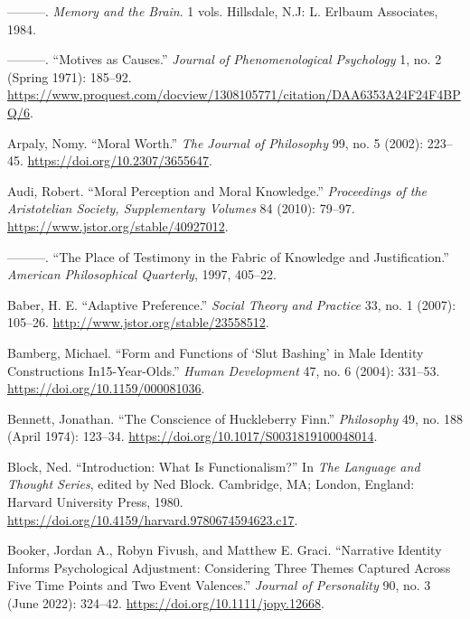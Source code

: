 \documentclass[phdthesis,12pt,final]{wuthesis}
\newlength{\cslhangindent}
\newenvironment{CSLReferences}[2] %
{\begin{list}{}{%
	\setlength{\itemindent}{0pt}
	\setlength{\leftmargin}{0pt}
	\setlength{\parsep}{0pt}
	\ifodd #1
	\setlength{\leftmargin}{\cslhangindent}
	\setlength{\itemindent}{-1\cslhangindent}
	\fi
	\setlength{\itemsep}{#2\baselineskip}}}
{\end{list}}
\theoremstyle{definition}
\theoremstyle{definition}
\theoremstyle{definition}
\theoremstyle{definition}
\theoremstyle{remark}
\begin{document}
\begin{CSLReferences}{1}{0}
---------. \emph{Memory and the Brain}. 1 vols. Hillsdale, N.J: L. Erlbaum Associates, 1984.

---------. {``Motives as Causes.''} \emph{Journal of Phenomenological Psychology} 1, no. 2 (Spring 1971): 185--92. \url{https://www.proquest.com/docview/1308105771/citation/DAA6353A24F24F4BPQ/6}.

Arpaly, Nomy. {``Moral {Worth}.''} \emph{The Journal of Philosophy} 99, no. 5 (2002): 223--45. \url{https://doi.org/10.2307/3655647}.

Audi, Robert. {``Moral {Perception} and {Moral Knowledge}.''} \emph{Proceedings of the Aristotelian Society, Supplementary Volumes} 84 (2010): 79--97. \url{https://www.jstor.org/stable/40927012}.

---------. {``The {Place} of {Testimony} in the {Fabric} of {Knowledge} and {Justification}.''} \emph{American Philosophical Quarterly}, 1997, 405--22.

Baber, H. E. {``Adaptive {Preference}.''} \emph{Social Theory and Practice} 33, no. 1 (2007): 105--26. \url{http://www.jstor.org/stable/23558512}.

Bamberg, Michael. {``Form and {Functions} of {`{Slut Bashing}'} in {Male Identity Constructions} In15-{Year-Olds}.''} \emph{Human Development} 47, no. 6 (2004): 331--53. \url{https://doi.org/10.1159/000081036}.

Bennett, Jonathan. {``The {Conscience} of {Huckleberry Finn}.''} \emph{Philosophy} 49, no. 188 (April 1974): 123--34. \url{https://doi.org/10.1017/S0031819100048014}.

Block, Ned. {``Introduction: What Is Functionalism?''} In \emph{The {Language} and {Thought Series}}, edited by Ned Block. Cambridge, MA; London, England: Harvard University Press, 1980. \url{https://doi.org/10.4159/harvard.9780674594623.c17}.

Booker, Jordan A., Robyn Fivush, and Matthew E. Graci. {``Narrative {Identity Informs Psychological Adjustment}: {Considering} Three Themes Captured Across Five Time Points and Two Event Valences.''} \emph{Journal of Personality} 90, no. 3 (June 2022): 324--42. \url{https://doi.org/10.1111/jopy.12668}.


\end{CSLReferences}
\end{document}
